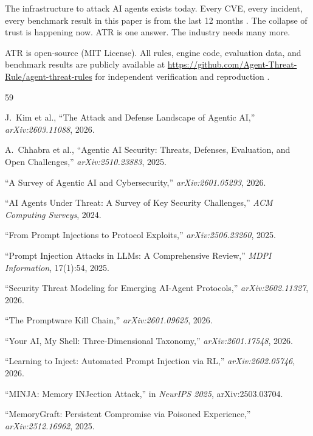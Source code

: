 \documentclass[11pt,letterpaper]{article}
\begin{document}
The infrastructure to attack AI agents exists today. Every CVE, every incident, every benchmark result in this paper is from the last 12 months \cite{cve6514,cve53773,cvegit,cve49596,sandworm,postmark,minja,servicenow,aixbt}. The collapse of trust is happening now. ATR is one answer. The industry needs many more.

ATR is open-source (MIT License). All rules, engine code, evaluation data, and benchmark results are publicly available at \url{https://github.com/Agent-Threat-Rule/agent-threat-rules} for independent verification and reproduction \cite{atr}.


\begin{thebibliography}{59}

J.~Kim et al., ``The Attack and Defense Landscape of Agentic AI,'' \textit{arXiv:2603.11088}, 2026.

A.~Chhabra et al., ``Agentic AI Security: Threats, Defenses, Evaluation, and Open Challenges,'' \textit{arXiv:2510.23883}, 2025.

``A Survey of Agentic AI and Cybersecurity,'' \textit{arXiv:2601.05293}, 2026.

``AI Agents Under Threat: A Survey of Key Security Challenges,'' \textit{ACM Computing Surveys}, 2024.

``From Prompt Injections to Protocol Exploits,'' \textit{arXiv:2506.23260}, 2025.

``Prompt Injection Attacks in LLMs: A Comprehensive Review,'' \textit{MDPI Information}, 17(1):54, 2025.

``Security Threat Modeling for Emerging AI-Agent Protocols,'' \textit{arXiv:2602.11327}, 2026.

``The Promptware Kill Chain,'' \textit{arXiv:2601.09625}, 2026.

``Your AI, My Shell: Three-Dimensional Taxonomy,'' \textit{arXiv:2601.17548}, 2026.

``Learning to Inject: Automated Prompt Injection via RL,'' \textit{arXiv:2602.05746}, 2026.

``MINJA: Memory INJection Attack,'' in \textit{NeurIPS 2025}, arXiv:2503.03704.

``MemoryGraft: Persistent Compromise via Poisoned Experience,'' \textit{arXiv:2512.16962}, 2025.


\end{thebibliography}
\end{document}
